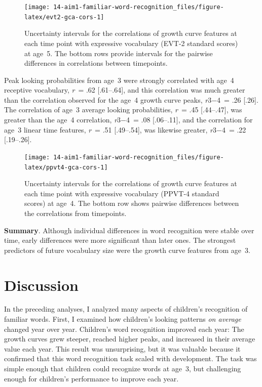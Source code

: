 \documentclass [11pt, proquest] {uwthesis}[2015/03/03]
\begin{document}
\begin{figure}
\texttt{[image: 14-aim1-familiar-word-recognition\_files/figure-latex/evt2-gca-cors-1]} \caption{Uncertainty intervals for the correlations of growth
curve features at each time point with expressive vocabulary (EVT-2
standard scores) at age~5. The bottom rows provide intervals for the
pairwise differences in correlations between timepoints.}\label{fig:evt2-gca-cors}
\end{figure}
Peak looking probabilities from age~3 were strongly correlated with
age~4 receptive vocabulary, \emph{r}~= .62 {[}.61--.64{]}, and this
correlation was much greater than the correlation observed for the age~4
growth curve peaks, \emph{r}3−4~= .26 {[}.26{]}. The correlation of
age~3 average looking probabilities, \emph{r}~= .45 {[}.44--.47{]}, was
greater than the age~4 correlation, \emph{r}3−4~= .08 {[}.06--.11{]},
and the correlation for age~3 linear time features, \emph{r}~= .51
{[}.49--.54{]}, was likewise greater, \emph{r}3−4~= .22 {[}.19--.26{]}.





\begin{figure}
\texttt{[image: 14-aim1-familiar-word-recognition\_files/figure-latex/ppvt4-gca-cors-1]} \caption{Uncertainty intervals for the correlations of
growth curve features at each time point with expressive vocabulary
(PPVT-4 standard scores) at age~4. The bottom row shows pairwise
differences between the correlations from timepoints.}\label{fig:ppvt4-gca-cors}
\end{figure}
\textbf{Summary}. Although individual differences in word recognition
were stable over time, early differences were more significant than
later ones. The strongest predictors of future vocabulary size were the
growth curve features from age~3.

\section{Discussion}\label{discussion}

In the preceding analyses, I analyzed many aspects of children's
recognition of familiar words. First, I examined how children's looking
patterns \emph{on average} changed year over year. Children's word
recognition improved each year: The growth curves grew steeper, reached
higher peaks, and increased in their average value each year. This
result was unsurprising, but it was valuable because it confirmed that
this word recognition task scaled with development. The task was simple
enough that children could recognize words at age~3, but challenging
enough for children's performance to improve each year.
\end{document}
